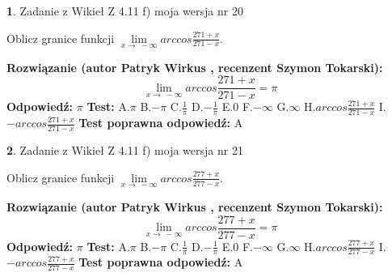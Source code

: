 \documentclass[12pt, a4paper]{article}
\theoremstyle{definition} %
\newtheorem{zad}{}
\newcommand{\zadStart}[1]{\begin{zad}#1\newline}
\newcommand{\zadStop}{\end{zad}}
\newcommand{\rozwStart}[2]{\noindent \textbf{Rozwiązanie (autor #1 , recenzent #2): }\newline}
\newcommand{\rozwStop}{\newline}
\newcommand{\odpStart}{\noindent \textbf{Odpowiedź:}\newline}
\newcommand{\odpStop}{\newline}
\newcommand{\testStart}{\noindent \textbf{Test:}\newline}
\newcommand{\testStop}{\newline}
\newcommand{\kluczStart}{\noindent \textbf{Test poprawna odpowiedź:}\newline}
\newcommand{\kluczStop}{\newline}
\begin{document}
\zadStart{Zadanie z Wikieł Z 4.11 f) moja wersja nr 20}

Oblicz granice funkcji $\lim\limits_{x\to\ -\infty}arccos\frac{271+x}{271-x}$.
\zadStop
\rozwStart{Patryk Wirkus}{Szymon Tokarski}
$$\lim\limits_{x\to\ -\infty}arccos\frac{271+x}{271-x} = \pi$$
\rozwStop
\odpStart
$\pi$
\odpStop
\testStart
A.$\pi$ B.$-\pi$ C.$\frac{1}{\pi}$ D.$-\frac{1}{\pi}$ E.$0$ F.$-\infty$ G.$\infty$ H.$arccos\frac{271+x}{271-x}$ I.$-arccos\frac{271+x}{271-x}$
\testStop
\kluczStart
A
\kluczStop



\zadStart{Zadanie z Wikieł Z 4.11 f) moja wersja nr 21}

Oblicz granice funkcji $\lim\limits_{x\to\ -\infty}arccos\frac{277+x}{277-x}$.
\zadStop
\rozwStart{Patryk Wirkus}{Szymon Tokarski}
$$\lim\limits_{x\to\ -\infty}arccos\frac{277+x}{277-x} = \pi$$
\rozwStop
\odpStart
$\pi$
\odpStop
\testStart
A.$\pi$ B.$-\pi$ C.$\frac{1}{\pi}$ D.$-\frac{1}{\pi}$ E.$0$ F.$-\infty$ G.$\infty$ H.$arccos\frac{277+x}{277-x}$ I.$-arccos\frac{277+x}{277-x}$
\testStop
\kluczStart
A
\kluczStop
\end{document}
